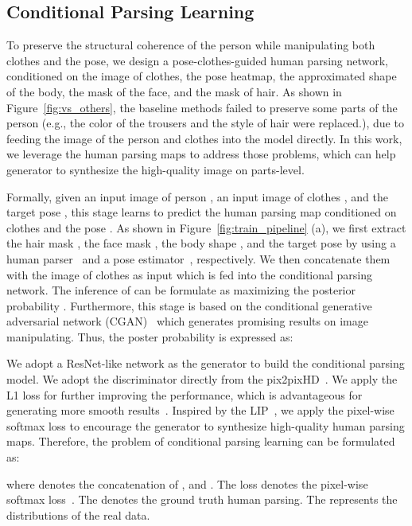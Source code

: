 \documentclass[10pt,twocolumn,letterpaper]{article}
\begin{document}
\subsection{Conditional Parsing Learning}
To preserve the structural coherence of the person while manipulating both clothes and the pose, we design a pose-clothes-guided human parsing network, conditioned on the image of clothes, the pose heatmap, the approximated shape of the body, the mask of the face, and the mask of hair. As shown in Figure~\ref{fig:vs_others}, the baseline methods failed to preserve some parts of the person (e.g., the color of the trousers and the style of hair were replaced.), due to feeding the image of the person and clothes into the model directly. In this work, we leverage the human parsing maps to address those problems, which can help generator to synthesize the high-quality image on parts-level.

Formally, given an input image of person , an input image of clothes , and the target pose , this stage learns to predict the human parsing map  conditioned on clothes  and the pose . As shown in Figure~\ref{fig:train_pipeline} (a), we first extract the hair mask , the face mask , the body shape  , and the target pose  by using a human parser~\cite{gong2017look} and a pose estimator~\cite{cao2017openpose}, respectively. We then concatenate them with the image of clothes as input which is fed into the conditional parsing network. The inference of  can be formulate as maximizing the posterior probability . Furthermore, this stage is based on the conditional generative adversarial network (CGAN)~\cite{mirza2014cgan} which generates promising results on image manipulating. Thus, the poster probability  is expressed as:

We adopt a ResNet-like network as the generator  to build the conditional parsing model. We adopt the discriminator  directly from the pix2pixHD~\cite{wang2017pix2pixHD}. We apply the L1 loss for further improving the performance, which is advantageous for generating more smooth results~\cite{yan2017skeleton}. Inspired by the LIP~\cite{gong2017look}, we apply the pixel-wise softmax loss to encourage the generator to synthesize high-quality human parsing maps. Therefore, the problem of conditional parsing learning can be formulated as:

where  denotes the concatenation of , and . The loss  denotes the pixel-wise softmax loss~\cite{gong2017look}. The  denotes the ground truth human parsing. The  represents the distributions of the real data. 
\end{document}
